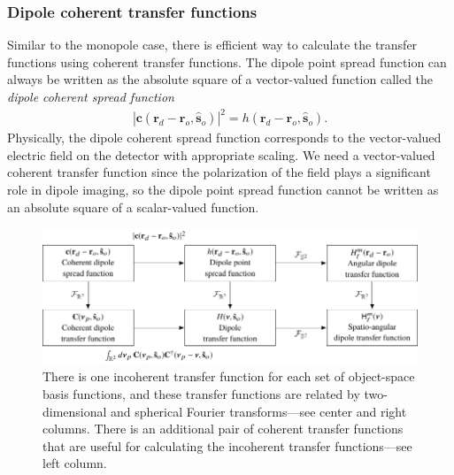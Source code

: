 \documentclass[]{osa-article}
\providecommand{\mb}[1]{\mathbf{#1}}
\providecommand{\ro}{\mathbf{\mathbf{r}}_o}
\providecommand{\so}{\mathbf{\hat{s}}_o}
\providecommand{\rd}{\mathbf{r}_d}
\begin{document}
\subsubsection{Dipole coherent transfer functions}
Similar to the monopole case, there is efficient way to calculate the transfer
functions using coherent transfer functions. The dipole point spread function
can always be written as the absolute square of a vector-valued function called
the \textit{dipole coherent spread function}
\begin{align}
  |\mb{c}(\rd - \ro, \so)|^2 = h(\rd - \ro, \so). \label{eq:absquare2}
\end{align}
Physically, the dipole coherent spread function corresponds to the vector-valued
electric field on the detector with appropriate scaling. We need a vector-valued
coherent transfer function since the polarization of the field plays a
significant role in dipole imaging, so the dipole point spread function cannot
be written as an absolute square of a scalar-valued function.

\begin{figure}
  \hspace{-2em}
  \includegraphics[scale=1.0]{../figures/transfer-functions/transfer-functions.pdf}
  \caption{There is one incoherent transfer function for each set of
    object-space basis functions, and these transfer functions are related by
    two-dimensional and spherical Fourier transforms---see center and right
    columns. There is an additional pair of coherent transfer functions that
    are useful for calculating the incoherent transfer functions---see left column.}
   \label{fig:transfer-functions}
 \end{figure}
    
\end{document}
